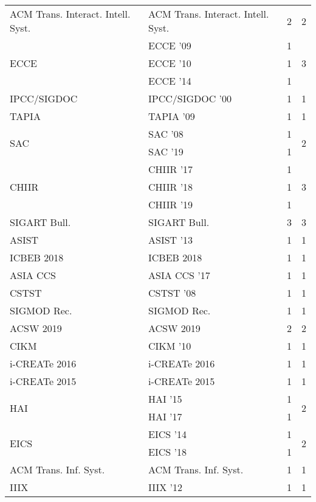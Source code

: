 \begin{table*}[t]
\begin{tabular}{llrr}
\multirow{1}{*}{ACM Trans. Interact. Intell. Syst.} & ACM Trans. Interact. Intell. Syst. & 2 & \multirow{1}{*}{2}\\
\multirow{3}{*}{ECCE } & ECCE '09 & 1 & \multirow{3}{*}{3}\\
& ECCE '10 & 1 &\\
& ECCE '14 & 1 &\\
\multirow{1}{*}{IPCC/SIGDOC } & IPCC/SIGDOC '00 & 1 & \multirow{1}{*}{1}\\
\multirow{1}{*}{TAPIA } & TAPIA '09 & 1 & \multirow{1}{*}{1}\\
\multirow{2}{*}{SAC } & SAC '08 & 1 & \multirow{2}{*}{2}\\
& SAC '19 & 1 &\\
\multirow{3}{*}{CHIIR } & CHIIR '17 & 1 & \multirow{3}{*}{3}\\
& CHIIR '18 & 1 &\\
& CHIIR '19 & 1 &\\
\multirow{1}{*}{SIGART Bull.} & SIGART Bull. & 3 & \multirow{1}{*}{3}\\
\multirow{1}{*}{ASIST } & ASIST '13 & 1 & \multirow{1}{*}{1}\\
\multirow{1}{*}{ICBEB 2018} & ICBEB 2018 & 1 & \multirow{1}{*}{1}\\
\multirow{1}{*}{ASIA CCS } & ASIA CCS '17 & 1 & \multirow{1}{*}{1}\\
\multirow{1}{*}{CSTST } & CSTST '08 & 1 & \multirow{1}{*}{1}\\
\multirow{1}{*}{SIGMOD Rec.} & SIGMOD Rec. & 1 & \multirow{1}{*}{1}\\
\multirow{1}{*}{ACSW 2019} & ACSW 2019 & 2 & \multirow{1}{*}{2}\\
\multirow{1}{*}{CIKM } & CIKM '10 & 1 & \multirow{1}{*}{1}\\
\multirow{1}{*}{i-CREATe 2016} & i-CREATe 2016 & 1 & \multirow{1}{*}{1}\\
\multirow{1}{*}{i-CREATe 2015} & i-CREATe 2015 & 1 & \multirow{1}{*}{1}\\
\multirow{2}{*}{HAI } & HAI '15 & 1 & \multirow{2}{*}{2}\\
& HAI '17 & 1 &\\
\multirow{2}{*}{EICS } & EICS '14 & 1 & \multirow{2}{*}{2}\\
& EICS '18 & 1 &\\
\multirow{1}{*}{ACM Trans. Inf. Syst.} & ACM Trans. Inf. Syst. & 1 & \multirow{1}{*}{1}\\
\multirow{1}{*}{IIIX } & IIIX '12 & 1 & \multirow{1}{*}{1}\\

\end{tabular}
\end{table*}
